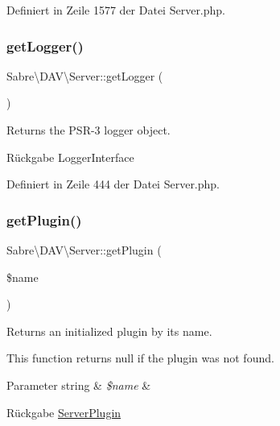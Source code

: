 Definiert in Zeile 1577 der Datei Server.\+php.

\mbox{\label{class_sabre_1_1_d_a_v_1_1_server_af65d4d29148e73df8520816c071e18f6}} 
\subsubsection{\texorpdfstring{get\+Logger()}{getLogger()}}
{\footnotesize\ttfamily Sabre\textbackslash{}\+D\+A\+V\textbackslash{}\+Server\+::get\+Logger (\begin{DoxyParamCaption}{ }\end{DoxyParamCaption})}

Returns the P\+S\+R-\/3 logger object.

\begin{DoxyReturn}{Rückgabe}
Logger\+Interface 
\end{DoxyReturn}


Definiert in Zeile 444 der Datei Server.\+php.

\mbox{\label{class_sabre_1_1_d_a_v_1_1_server_a031cd7834c452c3cd172b13f4b15f09f}} 
\subsubsection{\texorpdfstring{get\+Plugin()}{getPlugin()}}
{\footnotesize\ttfamily Sabre\textbackslash{}\+D\+A\+V\textbackslash{}\+Server\+::get\+Plugin (\begin{DoxyParamCaption}\item[{}]{\$name }\end{DoxyParamCaption})}

Returns an initialized plugin by it\textquotesingle{}s name.

This function returns null if the plugin was not found.


\begin{DoxyParams}[1]{Parameter}
string & {\em \$name} & \\
\hline
\end{DoxyParams}
\begin{DoxyReturn}{Rückgabe}
\mbox{\hyperlink{class_sabre_1_1_d_a_v_1_1_server_plugin}{Server\+Plugin}} 
\end{DoxyReturn}



